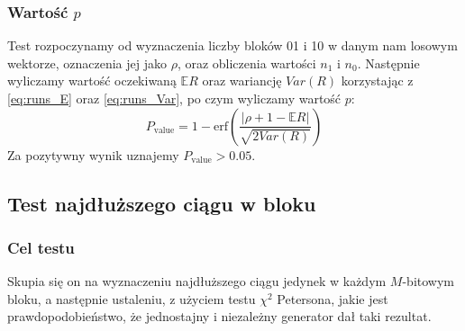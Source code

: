 \subsubsection{Wartość $p$}
Test rozpoczynamy od wyznaczenia liczby bloków 01 i 10 w danym nam losowym wektorze, oznaczenia jej jako $\rho$, oraz obliczenia wartości $n_1$ i $n_0$. Następnie wyliczamy wartość oczekiwaną $\mathbb{E}R$ oraz wariancję $Var(R)$ korzystając z \ref{eq:runs_E} oraz \ref{eq:runs_Var}, po czym wyliczamy wartość $p$:
\begin{equation}
    P_{\textrm{value}} =  1 - \textrm{erf}\left(\frac{|\rho + 1 - \mathbb{E}R|}{\sqrt{2Var(R)}} \right)
\end{equation}
Za pozytywny wynik uznajemy $P_{\textrm{value}} > 0.05$. 
\subsection{Test najdłuższego ciągu w bloku}
\subsubsection{Cel testu}
Skupia się on na wyznaczeniu najdłuższego ciągu jedynek w każdym $M$-bitowym bloku, a następnie ustaleniu, z użyciem testu $\chi^2$ Petersona, jakie jest prawdopodobieństwo, że jednostajny i niezależny generator dał taki rezultat.
